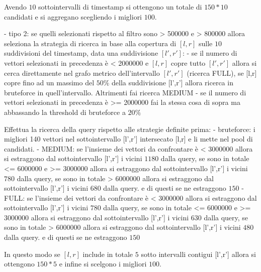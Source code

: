  Avendo $10$ sottointervalli di timestamp si ottengono un totale di $150*10$ candidati 
 e si aggregano scegliendo i migliori $100$.
 
- tipo 2: se quelli selezionati rispetto al filtro sono > 500000 e > 800000 allora 
 seleziona la strategia di ricerca in base alla copertura di $[l,r]$ sulle $10$ 
 suddivisioni del timestamp, data una suddivisione $[l',r']$:
    - se il numero di vettori selezionati in precedenza è < 2000000 e $[l,r]$ copre 
    tutto $[l',r']$ allora si cerca direttamente nel grafo metrico dell'intervallo $[l',r']$ (ricerca FULL),
    se [l,r] copre fino ad un massimo del $50\%$ della suddivisione [l',r'] allora 
    ricerca in bruteforce in quell'intervallo. Altrimenti fai ricerca MEDIUM
    - se il numero di vettori selezionati in precedenza è >= 2000000 fai la stessa 
    cosa di sopra ma abbassando la threshold di bruteforce a  $20\%$

  Effettua la ricerca della query rispetto alle strategie definite prima:
    - bruteforce: i migliori 140 vettori nel sottointervallo [l',r'] intersecato [l,r]
    e li mette nel pool di candidati.
    - MEDIUM: se l'insieme dei vettori da confrontare è < 3000000 allora si estraggono 
    dal sottointervallo [l',r'] i vicini $1180$ dalla query, se sono in totale <= 6000000 e >=  3000000
    allora si estraggono dal sottointervallo [l',r'] i vicini $780$ dalla query, 
    se sono in totale > 6000000 allora si estraggono dal sottointervallo [l',r'] i vicini $680$ dalla query.
    e di questi se ne estraggono $150$
    - FULL: se l'insieme dei vettori da confrontare è < 3000000 allora si estraggono 
    dal sottointervallo [l',r'] i vicini $780$ dalla query, se sono in totale <= 6000000 e >=  3000000
    allora si estraggono dal sottointervallo [l',r'] i vicini $630$ dalla query, 
    se sono in totale > 6000000 allora si estraggono dal sottointervallo [l',r'] i vicini $480$ dalla query.
    e di questi se ne estraggono $150$
  
  In questo modo se $[l,r]$ include in totale $5$ sotto intervalli contigui [l',r']
  allora si ottengono $150*5$ e infine si scelgono i migliori $100$.
